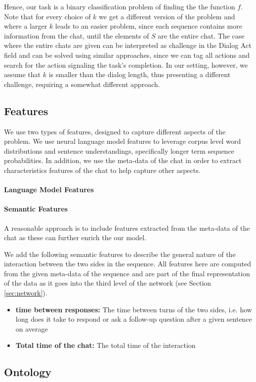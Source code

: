 Hence, our task is a binary classification 
problem of finding the the function $f$.  
Note that for every choice of $k$ we get a different 
version of the problem and where a larger $k$ leads 
to an easier problem, since each sequence contains 
more information from the chat, until the elements of $S$ 
are the entire chat. The case where the entire chats are 
given can be interpreted as challenge in the Dialog Act \cite{cs-CL-0006023,DBLP:conf/icassp/JiB05,DBLP:conf/coling/WermterL96}
field and can be solved using similar approaches, since we 
can tag all actions and search for the action signaling the task's completion. 
In our setting, however, we assume that $k$ is smaller than the dialog 
length, thus presenting a different challenge, requiring a somewhat different approach. 

\subsection{Features}
We use two types of features, designed to capture
different aspects of the problem. We use neural 
language model features to leverage corpus
level word distributions and sentence understandings, 
specifically longer term
sequence probabilities. In addition, we use the meta-data of the chat in order to extract characteristics features of the chat 
to help capture other aspects.

\paragraph*{Language Model Features}

\paragraph*{Semantic Features}
A reasonable approach is to include features 
extracted from the meta-data of the chat as 
these can further enrich the our model. 

We add the following semantic features 
to describe the general nature 
of the interaction between the two sides 
in the sequence. All features here 
are computed from the given meta-data of the sequence and 
are part of the final representation of the data as it goes into the 
third level of the network (see Section \ref{sec:network}). 

\begin{itemize}
\item {\bf time between responses: } The time between 
turns of the two sides, i.e. how long does it take to respond or ask a follow-up question after a given sentence on average

\item {\bf Total time of the chat: } The total time of the interaction 

\end{itemize} 

\subsection{Ontology}
